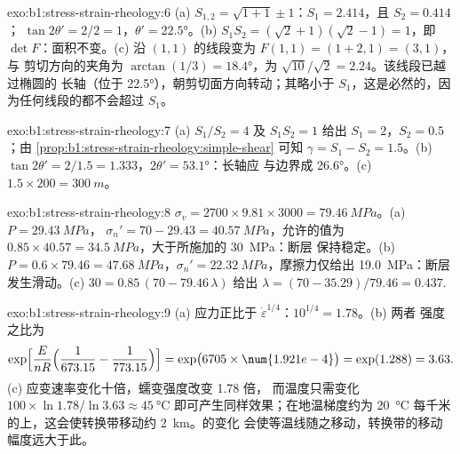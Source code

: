 \begin{solution}{exo:b1:stress-strain-rheology:6}
(a) $S_{1,2} = \sqrt{1 + 1} \pm 1$：$S_1 = 2.414$，且 $S_2 = 0.414$；
$\tan2\theta' = 2/2 = 1$，$\theta' = \ang{22.5}$。(b) $S_1S_2 =
(\sqrt2 + 1)(\sqrt2 - 1) = 1$，即 $\det F$：面积不变。(c) 沿
$(1, 1)$ 的线段变为 $F(1, 1) = (1 + 2, 1) = (3, 1)$，与
剪切方向的夹角为 $\arctan(1/3) = \ang{18.4}$，为
$\sqrt{10}/\sqrt2 = 2.24$。该线段已越过椭圆的
长轴（位于 \ang{22.5}），朝剪切面方向转动；其略小于
$S_1$，这是必然的，因为任何线段的都不会超过 $S_1$。
\end{solution}

\begin{solution}{exo:b1:stress-strain-rheology:7}
(a) $S_1/S_2 = 4$ 及 $S_1S_2 = 1$ 给出 $S_1 = 2$，$S_2 = 0.5$；由
\cref{prop:b1:stress-strain-rheology:simple-shear} 可知 $\gamma = S_1 - S_2 =
1.5$。(b) $\tan2\theta' = 2/1.5 = 1.333$，$2\theta' = \ang{53.1}$：长轴应
与边界成 \ang{26.6}。(c) $1.5\times200 = \qty{300}{m}$。
\end{solution}

\begin{solution}{exo:b1:stress-strain-rheology:8}
$\sigma_v = 2700\times9.81\times3000 = \qty{79.46}{MPa}$。(a) $P = \qty{29.43}{MPa}$，
$\sigma_n' = 70 - 29.43 = \qty{40.57}{MPa}$，允许的值为
$0.85\times40.57 = \qty{34.5}{MPa}$，大于所施加的 \qty{30}{MPa}：断层
保持稳定。(b) $P = 0.6\times79.46 = \qty{47.68}{MPa}$，$\sigma_n' =
\qty{22.32}{MPa}$，摩擦力仅给出 \qty{19.0}{MPa}：断层
发生滑动。(c) $30 = 0.85\,(70 - 79.46\,\lambda)$ 给出 $\lambda = (70 -
35.29)/79.46 = 0.437$.
\end{solution}

\begin{solution}{exo:b1:stress-strain-rheology:9}
(a) 应力正比于 $\dot\varepsilon^{1/4}$：$10^{1/4} = 1.78$。(b) 两者
强度之比为
\[
  \exp\Bigl[\frac{E}{nR}\Bigl(\frac{1}{673.15} - \frac{1}{773.15}\Bigr)\Bigr]
  = \exp\bigl(6705\times\num{1.921e-4}\bigr) = \exp(1.288) = 3.63 .
\]
(c) 应变速率变化十倍，蠕变强度改变 1.78 倍，
而温度只需变化 $100\times\ln1.78/\ln3.63 \approx
\qty{45}{\degreeCelsius}$ 即可产生同样效果；在地温梯度约为 \qty{20}{\degreeCelsius}
每千米的上，这会使转换带移动约 \qty{2}{km}。的变化
会使等温线随之移动，转换带的移动幅度远大于此。
\end{solution}

